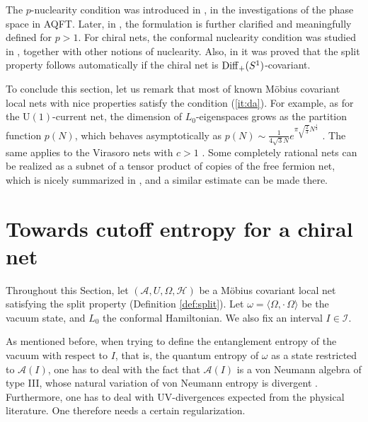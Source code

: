 \documentclass[a4paper,12pt]{article}
\theoremstyle{plain}
\theoremstyle{definition}
\theoremstyle{remark}
\newcommand{\inner}  [2]{\langle #1 , #2 \rangle}
\newcommand{\Diff}{{\rm Diff}_+(S^1)}
\def\A{{\mathcal A}}
\def\H{{\mathcal H}}
\begin{document}
 The $p$-nuclearity condition was introduced in \cite{bucpor90}, in the investigations of the phase space in AQFT.
 Later, in \cite{fop05}, the formulation is further clarified and meaningfully defined for $p>1$.
 For chiral nets, the conformal nuclearity condition was studied in \cite{bdl07}, together with other notions of nuclearity.
 Also, in \cite{mtw16} it was proved that the split property follows automatically if the chiral net is $\Diff$-covariant.


To conclude this section, let us remark that
most of known M\"obius covariant local nets with nice properties satisfy the condition (\ref{it:da}).
For example, as for the $\mathrm{U}(1)$-current net,
the dimension of $L_0$-eigenspaces grows as the partition function $p(N)$, which behaves asymptotically as
$p(N) \sim \frac{1}{4\sqrt{3}N}e^{\pi\sqrt{\frac23}N^\frac12}$ \cite[24.2.1.III]{abraste}.
The same applies to the Virasoro nets with $c > 1$ \cite{KR87}.
Some completely rational nets can be realized as a subnet of a tensor product of copies of the free fermion net,
which is nicely summarized in \cite[Section 4.2]{Tener16}, and a similar estimate can be made there.




\section{Towards cutoff entropy for a chiral net}\label{sec:cut}

Throughout this Section, let $(\A,U,\Omega,\H)$ be a M\"obius
covariant local net satisfying the split property (Definition
\ref{def:split}). Let $\omega = \inner{\Omega}{\cdot\,\Omega}$ be the
vacuum state, and $L_0$ the conformal Hamiltonian. We also fix an
interval $I\in\mathcal{I}$.

As mentioned before, when trying to define the entanglement entropy of
the vacuum with respect to $I$, that is, the quantum entropy of
$\omega$ as a state restricted to $\A(I)$, one has to deal with the
fact that $\A(I)$ is a von Neumann algebra of type III, whose natural variation of von Neumann entropy
is divergent \cite[Lemma 6.10]{ohyapetz}\cite[Lemma 2.4]{narnhofer94}. Furthermore, one has to deal with
UV-divergences expected from the physical literature. One therefore needs
a certain regularization.
\end{document}
